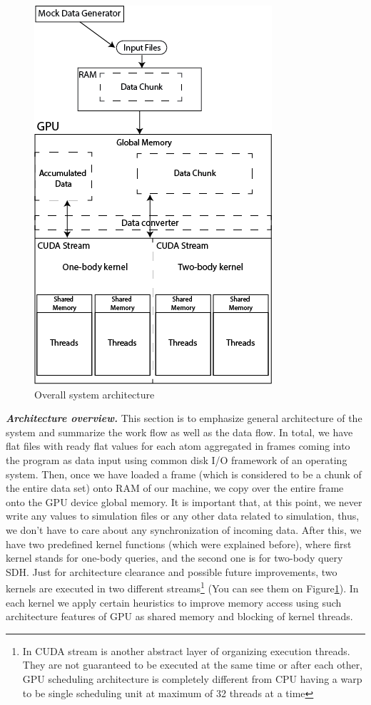 \documentclass[12pt,letterpaper]{report}
\begin{document}
\begin{figure}
 \centerline{ \includegraphics[width=0.65\columnwidth]{images/overallarchitecture} }
 \caption{Overall system architecture}
 \label{fg:overallarchitecture}
\end{figure}


\emph{\textbf{Architecture overview.}}
This section is to emphasize general architecture of the system and summarize the work flow as well as the data flow. In total, we have flat files with ready flat values for each atom aggregated in frames coming into the program as data input using common disk I/O framework of an operating system. Then, once we have loaded a frame (which is considered to be a chunk of the entire data set) onto RAM of our machine, we copy over the entire frame onto the GPU device global memory. It is important that, at this point, we never write any values to simulation files or any other data related to simulation, thus, we don't have to care about any synchronization of incoming data. After this, we have two predefined kernel functions (which were explained before), where first kernel stands for one-body queries, and the second one is for two-body query SDH. Just for architecture clearance and possible future improvements, two kernels are executed in two different streams\footnote{In CUDA stream is another abstract layer of organizing execution threads. They are not guaranteed to be executed at the same time or after each other, GPU scheduling architecture is completely different from CPU having a warp to be single scheduling unit at maximum of 32 threads at a time} (You can see them on Figure\ref{fg:overallarchitecture}). In each kernel we apply certain heuristics to improve memory access using such architecture features of GPU as shared memory and blocking of kernel threads.
\end{document}
